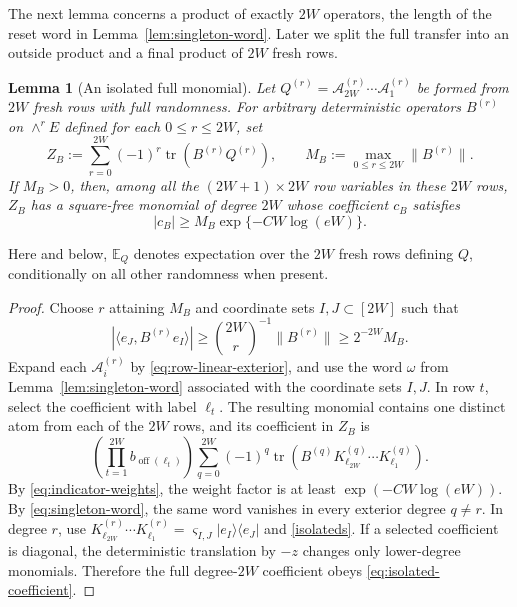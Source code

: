 \documentclass[11pt,reqno]{amsart}
\numberwithin{equation}{section}
\newtheorem{lemma}[theorem]{Lemma}
\theoremstyle{definition}
\theoremstyle{remark}
\newcommand{\E}{\mathbb E}
\newcommand{\1}{\mathbf 1}
\DeclareMathOperator{\tr}{tr}
\begin{document}
The next lemma concerns a product of exactly $2W$ operators, the length of
the reset word in Lemma~\ref{lem:singleton-word}.  Later we split the full
transfer into an outside product and a final product of $2W$ fresh rows.
\begin{lemma}[An isolated full monomial]\label{lem:isolated-monomial}
Let $Q^{(r)}=\mathcal A_{2W}^{(r)}\cdots\mathcal A_1^{(r)}$ be formed from
$2W$ fresh rows with full randomness.  For arbitrary deterministic operators $B^{(r)}$ on $\wedge^rE$ defined for each $0\le r\le 2W$, set
\[
 Z_B:=\sum_{r=0}^{2W}(-1)^r\tr(B^{(r)}Q^{(r)}),\qquad
 M_B:=\max_{0\le r\le2W}\|B^{(r)}\|.
\]
If $M_B>0$, then, among all the $(2W+1)\times 2W$ row variables in these $2W$ rows, $Z_B$ has a square-free monomial
of degree $2W$ whose coefficient $c_B$ satisfies
\begin{equation}\label{eq:isolated-coefficient}
 |c_B|\ge M_B\exp\{-C W\log(eW)\}.
\end{equation}
\end{lemma}

Here and below, $\E_Q$ denotes expectation over the $2W$ fresh rows
defining $Q$, conditionally on all other randomness when present.

\begin{proof}
Choose $r$ attaining $M_B$ and coordinate sets $I,J\subset[2W]$ such that
 \begin{equation}\label{isolateds}
 |\langle e_J,B^{(r)}e_I\rangle|
 \ge\binom{2W}{r}^{-1}\|B^{(r)}\|\ge2^{-2W}M_B.
\end{equation}
Expand each $\mathcal A_i^{(r)}$ by
\eqref{eq:row-linear-exterior}, and use the word $\omega$ from
Lemma~\ref{lem:singleton-word} associated with the coordinate sets $I,J$.
In row $t$, select the coefficient with label $\ell_t$.  The resulting
monomial contains one distinct atom from each of the $2W$ rows, and its
coefficient in $Z_B$ is
\[
 \left(\prod_{t=1}^{2W}b_{\operatorname{off}(\ell_t)}\right)
 \sum_{q=0}^{2W}(-1)^q
 \operatorname{tr}\!\left(
 B^{(q)}K_{\ell_{2W}}^{(q)}\cdots K_{\ell_1}^{(q)}\right).
\]
By \eqref{eq:indicator-weights}, the weight factor is at least
$\exp(-CW\log(eW))$.  By \eqref{eq:singleton-word}, the same word vanishes
in every exterior degree $q\ne r$.  In degree $r$, use
$K_{\ell_{2W}}^{(r)}\cdots K_{\ell_1}^{(r)}
=\varsigma_{I,J}|e_I\rangle\langle e_J|$ and \eqref{isolateds}.
If a selected coefficient is diagonal, the deterministic translation by
$-z$ changes only lower-degree monomials.  Therefore the full degree-$2W$
coefficient obeys \eqref{eq:isolated-coefficient}.
\end{proof}
\end{document}

